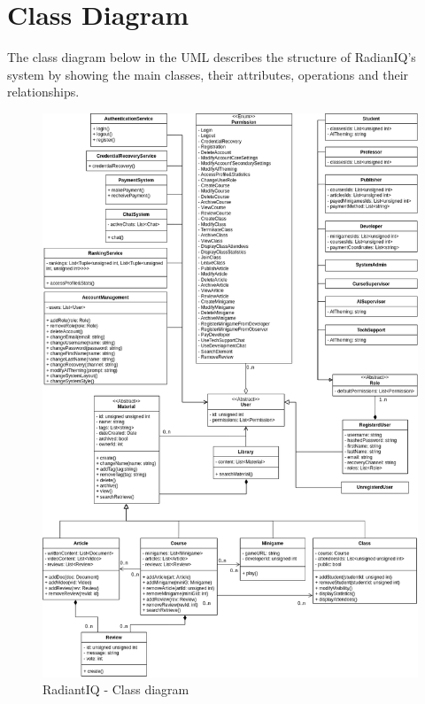\section{Class Diagram} \label{class-diagram}

The class diagram below in the UML describes the structure of RadianIQ's system by showing the main classes, their attributes, operations and their relationships.

\begin{figure}[H]
	\centering
	\includegraphics[width=0.85\linewidth]{images/class-diagram.png}
	\caption{RadiantIQ - Class diagram}
	\label{fig:class-diagram}
\end{figure}